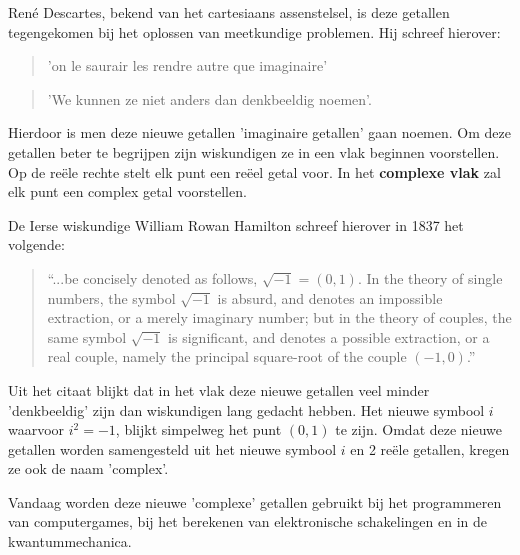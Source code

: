 \documentclass{ximera}
\begin{document}

René Descartes, bekend van het cartesiaans assenstelsel,  is deze getallen tegengekomen bij het oplossen van meetkundige problemen. Hij schreef hierover: 

\begin{quote}
    'on le saurair les rendre autre que imaginaire' 
\end{quote}
\begin{quote}
    'We kunnen ze niet anders dan denkbeeldig noemen'.
\end{quote}

Hierdoor is men deze nieuwe getallen 'imaginaire getallen' gaan noemen. Om deze getallen beter te begrijpen zijn wiskundigen ze in een vlak beginnen voorstellen. Op de reële rechte stelt elk punt een reëel getal voor. In het \textbf{complexe vlak} zal elk punt een complex getal voorstellen. 

De Ierse wiskundige William Rowan Hamilton schreef hierover in 1837 het volgende: 

\begin{quote}
    “...be concisely denoted as follows, \(\sqrt{-1} = (0, 1)\). In the theory of single numbers, the symbol \(\sqrt{-1}\) is absurd, and denotes an impossible extraction, or a merely imaginary number; but in the theory of couples, the same symbol \(\sqrt{-1}\) is significant, and denotes a possible extraction, or a real couple, namely the principal square-root of the couple \((-1,0)\).”
\end{quote}



Uit het citaat blijkt dat in het vlak deze nieuwe getallen veel minder 'denkbeeldig' zijn dan wiskundigen lang gedacht hebben. Het nieuwe symbool \(i\) waarvoor \(i^2 = -1\),  blijkt simpelweg het punt \((0,1)\) te zijn. Omdat deze nieuwe getallen worden samengesteld uit het nieuwe symbool \(i\) en 2 reële getallen, kregen ze ook de naam 'complex'. 

Vandaag worden deze nieuwe 'complexe' getallen gebruikt bij het programmeren van computergames, bij het berekenen van elektronische schakelingen en in de kwantummechanica.
\end{document}
